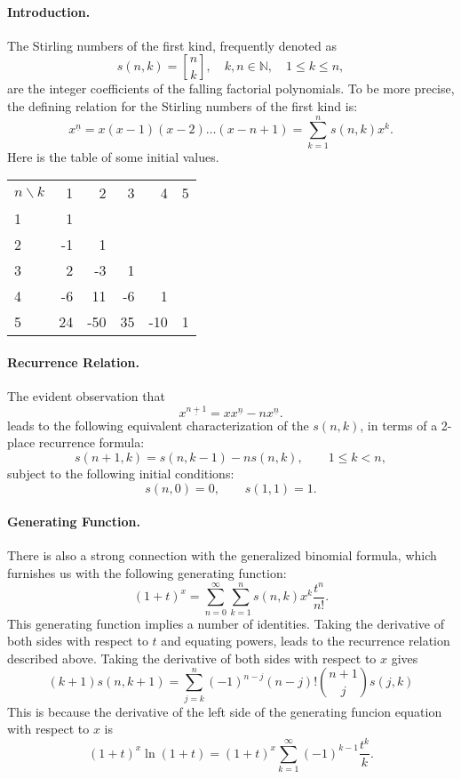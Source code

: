 \documentclass[12pt]{article}
\newcommand{\un}{{\underline{n}}}
\newcommand{\natnums}{\mathbb{N}}
\begin{document}
\paragraph{Introduction.}
The Stirling numbers of the first kind, frequently denoted as
$$s(n,k)= { n\brack k}, \quad k,n\in\natnums,\quad 1\leq k\leq n,$$
are the integer
coefficients of the falling factorial polynomials.  To be more precise,
the defining relation for the Stirling numbers of the first kind is:
$$x^\un = x(x-1)(x-2)\ldots(x-n+1) = \sum_{k=1}^n s(n,k)x^k.$$
Here is the table of some initial values.
\bigskip

\begin{tabular}{lrrrrr}
$n\backslash k$ & 1 & 2 & 3  & 4 & 5\\
1 & 1 \\
2 & -1 &  1 \\
3 & 2 & -3 & 1 \\
4 & -6 & 11 & -6 & 1 \\
5 & 24 & -50& 35& -10 & 1
\end{tabular}

\paragraph{Recurrence Relation.}
The evident observation that
$$x^{\underline{n+1}} = x x^\un -n x^\un.$$
leads to the following equivalent characterization of the $s(n,k)$, in
terms of a 2-place
recurrence formula:
$$s(n+1,k) = s(n,k-1) - ns(n,k),\qquad 1\leq k < n,$$
subject to the
following initial conditions:
$$s(n,0) = 0,\qquad s(1,1) = 1.$$

\paragraph{Generating Function.}
There is also a strong connection with the generalized binomial
formula, which furnishes us with the following generating function:
$$(1+t)^x = \sum_{n=0}^\infty \sum_{k=1}^n s(n,k) x^k
\frac{t^n}{n!}.$$
This generating function implies a number of identities.
Taking the derivative of both sides with respect to $t$ and equating
powers, leads to the recurrence relation described above.
Taking the derivative of both sides with respect to $x$ gives
$$
(k+1) s(n,k+1) = \sum_{j=k}^n (-1)^{n-j}(n-j)!\binom{n+1}{j}
s(j,k)$$
This is because the derivative of the left side of the
generating funcion equation with respect to $x$ is
$$
(1+t)^x \ln(1+t) =(1+t)^x \sum_{k=1}^\infty (-1)^{k-1}
\frac{t^k}{k}.$$
\end{document}

